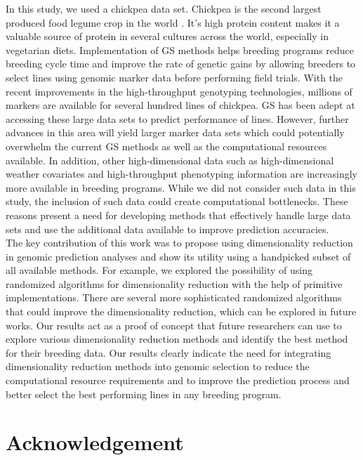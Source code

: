 In this study, we used a chickpea data set. Chickpea is the second largest produced food legume crop in the world \cite{roorkiwal_genome-enabled_2016}. It's high protein content makes it a valuable source of protein in several cultures across the world, especially in vegetarian diets. Implementation of GS methods helps breeding programs reduce breeding cycle time and improve the rate of genetic gains \cite{roorkiwal_genomic-enabled_2018} by allowing breeders to select lines using genomic marker data before performing field trials. With the recent improvements in the high-throughput genotyping technologies, millions of markers are available for several hundred lines of chickpea. GS has been adept at accessing these large data sets to predict performance of lines. However, further advances in this area will yield larger marker data sets which could potentially overwhelm the current GS methods as well as the computational resources available. In addition, other high-dimensional data such as high-dimensional weather covariates and high-throughput phenotyping information are increasingly more available in breeding programs. While we did not consider such data in this study, the inclusion of such data could create computational bottlenecks. These reasons present a need for developing methods that effectively handle large data sets and use the additional data available to improve prediction accuracies.  \\

The key contribution of this work was to propose using dimensionality reduction in genomic prediction analyses and show its utility using a handpicked subset of all available methods. For example, we explored the possibility of using randomized algorithms for dimensionality reduction with the help of primitive implementations. There are several more sophisticated randomized algorithms that could improve the dimensionality reduction, which can be explored in future works. Our results act as a proof of concept that future researchers can use to explore various dimensionality reduction methods and identify the best method for their breeding data. Our results clearly indicate the need for integrating dimensionality reduction methods into genomic selection to reduce the computational resource requirements and to improve the prediction process and better select the best performing lines in any breeding program. \\


\section{Acknowledgement}

